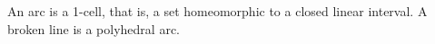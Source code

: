 An arc is a 1-cell, that is, a set homeomorphic to a closed linear interval. A broken line is a polyhedral arc.
